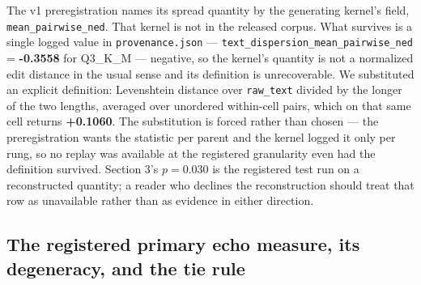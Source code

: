 The v1 preregistration names its spread quantity by the generating kernel's field, \texttt{mean\_pairwise\_ned}. That kernel is not in the released corpus. What survives is a single logged value in \texttt{provenance.json} --- \texttt{text\_dispersion\_mean\_pairwise\_ned} = \textbf{-0.3558} for Q3\_K\_M --- negative, so the kernel's quantity is not a normalized edit distance in the usual sense and its definition is unrecoverable. We substituted an explicit definition: Levenshtein distance over \texttt{raw\_text} divided by the longer of the two lengths, averaged over unordered within-cell pairs, which on that same cell returns \textbf{+0.1060}. The substitution is forced rather than chosen --- the preregistration wants the statistic per parent and the kernel logged it only per rung, so no replay was available at the registered granularity even had the definition survived. Section 3's $p = 0.030$ is the registered test run on a reconstructed quantity; a reader who declines the reconstruction should treat that row as unavailable rather than as evidence in either direction.

\subsection{The registered primary echo measure, its degeneracy, and the tie rule}

